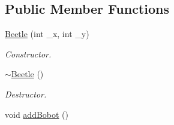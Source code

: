 \subsection*{Public Member Functions}
\begin{DoxyCompactItemize}
\item 
\hyperlink{classBeetle_a44270f6428b6fb3f6fceacce01ecc175}{Beetle} (int \-\_\-x, int \-\_\-y)
\begin{DoxyCompactList}\small\item\em Constructor. \end{DoxyCompactList}\item 
\hypertarget{classBeetle_a49832af20ae5029f08492b5fa1f1f242}{\hyperlink{classBeetle_a49832af20ae5029f08492b5fa1f1f242}{$\sim$\-Beetle} ()}\label{classBeetle_a49832af20ae5029f08492b5fa1f1f242}

\begin{DoxyCompactList}\small\item\em Destructor. \end{DoxyCompactList}\item 
\hypertarget{classBeetle_a1df2c2e5feb89b3619068270d1fbd344}{void \hyperlink{classBeetle_a1df2c2e5feb89b3619068270d1fbd344}{add\-Bobot} ()}\label{classBeetle_a1df2c2e5feb89b3619068270d1fbd344}


\end{DoxyCompactItemize}
